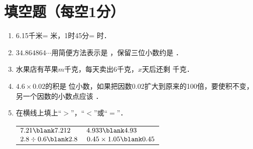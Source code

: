 \documentclass[12pt,twoside,space]{ctexart}
\begin{document}
\juemi %

  \section{填空题（每空1分）}
    \begin{enumerate}[itemsep=0.2em,topsep=0pt]
      \item 6.15千米= \blank 米，1时45分= \blank 时．
      \item $34.864864 \cdots $用简便方法表示是 \blank ，保留三位小数约是 \blank ．
      \item 水果店有苹果$m$千克，每天卖出6千克，$x$天后还剩 \blank 千克．
      \item $4.6\times 0.02$的积是 \blank 位小数，如果把因数0.02扩大到原来的100倍，要使积不变，另一个因数的小数点应该 \blank ．
      \item 在横线上填上“$>$”，“$<$”或“$=$”．\\[0.2em]
          \begin{tabular*}{\textwidth}{@{\extracolsep{\fill}} ll}
            $7.21 \blank 7.212$ & $4.933 \blank 4.93$ \\
            $2.8\div 0.6 \blank 2.8$ & $0.45\times 1.05 \blank 0.45$
          \end{tabular*}
      \end{enumerate}
\end{document}
